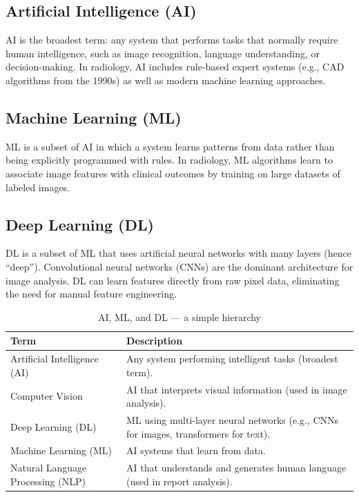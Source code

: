 \subsection*{Artificial Intelligence (AI)}
AI is the broadest term: any system that performs tasks that normally require human intelligence, such as image recognition, language understanding, or decision-making. In radiology, AI includes rule-based expert systems (e.g., CAD algorithms from the 1990s) as well as modern machine learning approaches.

\subsection*{Machine Learning (ML)}
ML is a subset of AI in which a system learns patterns from data rather than being explicitly programmed with rules. In radiology, ML algorithms learn to associate image features with clinical outcomes by training on large datasets of labeled images.

\subsection*{Deep Learning (DL)}
DL is a subset of ML that uses artificial neural networks with many layers (hence ``deep''). Convolutional neural networks (CNNs) are the dominant architecture for image analysis. DL can learn features directly from raw pixel data, eliminating the need for manual feature engineering.

\begin{table}[h]
\centering
\caption{AI, ML, and DL --- a simple hierarchy}
\begin{tabular}{|l|p{8cm}|}
\hline
\textbf{Term} & \textbf{Description} \\
\hline
Artificial Intelligence (AI) & Any system performing intelligent tasks (broadest term). \\
\hline
Computer Vision & AI that interprets visual information (used in image analysis). \\
\hline
Deep Learning (DL) & ML using multi-layer neural networks (e.g., CNNs for images, transformers for text). \\
\hline
Machine Learning (ML) & AI systems that learn from data. \\
\hline
Natural Language Processing (NLP) & AI that understands and generates human language (used in report analysis). \\
\hline
\end{tabular}
\end{table}


